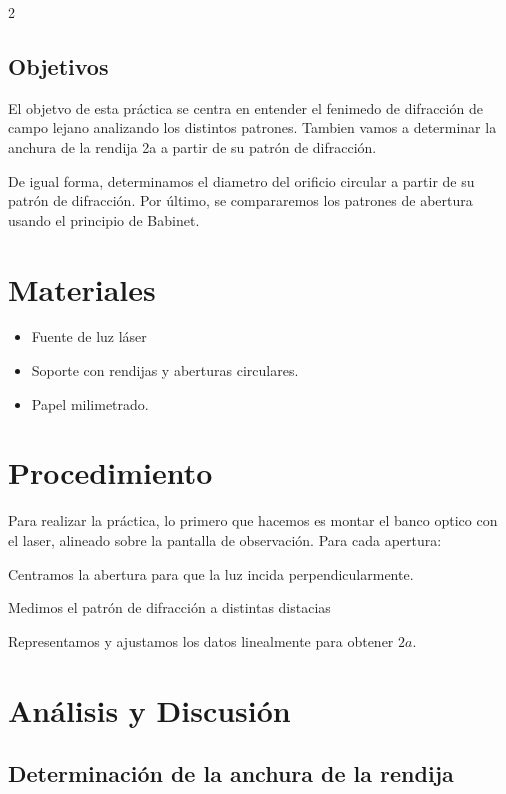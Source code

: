 \documentclass[12pt,a4paper]{article}
\begin{document}
\begin{multicols}{2}
\subsection{Objetivos}

\noindent
El objetvo de esta práctica se centra en entender el fenimedo de difracción de campo lejano analizando los distintos patrones. Tambien vamos a determinar la anchura de la rendija 2a a partir de su patrón de difracción.

\noindent
De igual forma, determinamos el diametro del orificio circular a partir de su patrón de difracción. Por último, se compararemos los patrones de abertura usando el principio de Babinet.

\section{Materiales}

\begin{itemize}
  \item Fuente de luz láser 
  \item Soporte con rendijas y aberturas circulares.
  \item Papel milimetrado.
\end{itemize}

\section{Procedimiento}
\noindent
Para realizar la práctica, lo primero que hacemos es montar el banco optico con el laser, alineado sobre la pantalla de observación. Para cada apertura:

\bigskip
\noindent
Centramos la abertura para que la luz incida perpendicularmente.

\bigskip
\noindent
Medimos el patrón de difracción a distintas distacias

\bigskip
\noindent
Representamos y ajustamos los datos linealmente para obtener $2a$.

\section{Análisis y Discusión}

\subsection{\texorpdfstring{Determinación de la anchura de la rendija}{Determinación de la anchura de la rendija}}


\end{multicols}
\end{document}
